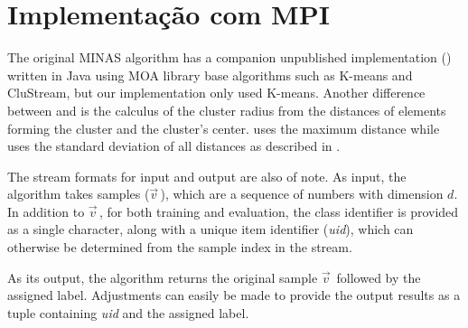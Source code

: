 
\section{Implementação com MPI}

The original MINAS algorithm has a companion unpublished implementation ()
written in Java using MOA library base algorithms such as K-means and CluStream,
but our implementation only used K-means.
Another difference between  and \mfog is the calculus of the cluster radius 
from the distances of elements forming the cluster and the cluster's center.
 uses the maximum distance while \mfog uses the standard deviation
of all distances as described in \cite{Faria2016minas}.

\newcommand{\val}{$\vec{v}\,$\xspace}
The stream formats for input and output are also of note.
As input, the algorithm takes samples (\val), which are a sequence of numbers
with dimension $d$.
In addition to \val, for both training and evaluation, the class
identifier is provided as a single character, along with a unique item identifier
(\emph{uid}), which can otherwise be determined from the sample index in the stream.

As its output, the algorithm returns the original sample \val followed by the
assigned label. Adjustments can easily be made to provide the output results as
a tuple containing \emph{uid} and the assigned label.



